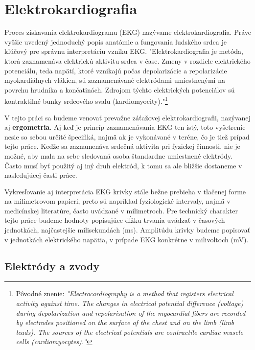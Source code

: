 \section{Elektrokardiografia}

Proces získavania elektrokardiogramu (EKG) nazývame elektrokardiografia. Práve vyššie uvedený jednoduchý popis anatómie a fungovania ľudského srdca je kľúčový pre správnu interpretáciu vzniku EKG. "Elektrokardiografia je metóda, ktorá zaznamenáva elektrickú aktivitu srdca v čase. Zmeny v rozdiele elektrického potenciálu, teda napätí, ktoré vznikajú počas depolarizácie a repolarizácie myokardiálnych vlákien, sú zaznamenávané elektródami umiestnenými na povrchu hrudníka a končatinách. Zdrojom týchto elektrických potenciálov sú kontraktilné bunky srdcového svalu (kardiomyocity)."\footnote{Pôvodné znenie: \textit{"Electrocardiography is a method that registers electrical activity against time. The changes in electrical potential difference (voltage) during depolarization and repolarisation of the myocardial fibers are recorded by electrodes positioned on the surface of the chest and on the limb (limb leads). The sources of the electrical potentials are contractile cardiac muscle cells (cardiomyocytes)."}}\cite{Wasilewski2011}

V tejto práci sa budeme venovať prevažne záťažovej elektrokardiografii, nazývanej aj \textbf{ergometria}. Aj keď je princíp zaznamenávania EKG ten istý, toto vyšetrenie nesie so sebou určité špecifiká, najmä ak je vykonávané v teréne, čo je tiež prípad tejto práce. Keďže sa zaznamenáva srdečná aktivita pri fyzickej činnosti, nie je možné, aby mala na sebe sledovaná osoba štandardne umiestnené elektródy. Často musí byť použitý aj iný druh elektród, k tomu sa ale bližšie dostaneme v nasledujúcej časti práce.

Vykresľovanie aj interpretácia EKG krivky stále bežne prebieha v tlačenej forme na milimetrovom papieri, preto sú napríklad fyziologické intervaly, najmä v medicínskej literatúre, často uvádzané v milimetroch. Pre technický charakter tejto práce budeme hodnoty popisujúce dĺžku trvania uvádzať v časových jednotkách, najčastejšie milisekundách (ms). Amplitúdu krivky budeme popisovať v jednotkách elektrického napätia, v prípade EKG konkrétne v milivoltoch (mV). 

\subsection{Elektródy a zvody}

